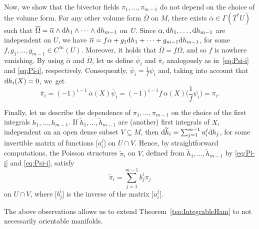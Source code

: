 \documentclass[pdftex]{sigma}%
\newcommand{\dd}{{\rm d}}
\numberwithin{equation}{section}
\begin{document}
Now, we show that the bivector fields $\pi_1,\dots,\pi_{m-1}$ do not depend on the choice of the volume form. For any other volume form $\overline{\Omega}$ on $M$, there exists $\overline{\alpha} \in \Gamma(T^{\ast}U)$ such that $\overline{\Omega} = \overline{\alpha}\wedge\dd h_1\wedge\cdots\wedge\dd h_{m-1}$ on~$U$. Since $\alpha,\dd h_1,\dots,\dd h_{m-1}$ are independent on $U$, we have $\overline{\alpha} = f\alpha + g_1\dd h_1 + \cdots + g_{m-1}\dd h_{m-1}$, for some $f,g_1,\dots,g_{m-1} \in C^{\infty}(U)$. Moreover, it holds that $\overline{\Omega}=f\Omega$, and so $f$ is nowhere vanishing. By using $\overline{\alpha}$ and $\overline{\Omega}$, let us define $\overline{\psi}_{i}$ and $\overline{\pi}_{i}$ analogously as in~\eqref{eq:Psi-i} and \eqref{eq:Pi-i}, respectively. Consequently, $\overline{\psi}_{i}=\tfrac{1}{f}\psi_{i}$ and, taking into account that $\dd h_{i}(X)=0$, we~get
 \begin{equation*}
 \overline{\pi}_{i} = (-1)^{i-1}\,\overline{\alpha}(X)\overline{\psi}_{i} = (-1)^{i-1}f\,\alpha(X)\bigg( \frac{1}{f} \psi_{i} \bigg) = \pi_{i}.
 \end{equation*}

Finally, let us describe the dependence of $\pi_1,\dots,\pi_{m-1}$ on the choice of the first integrals $h_1,\dots,h_{m-1}$. If $\widetilde{h}_1,\dots,\widetilde{h}_{m-1}$ are (another) first integrals of $X$, independent on an open dense subset $V\subseteq M$, then $\dd \widetilde{h}_{i} = \sum_{j=1}^{m-1}a^{j}_{i}\dd h_{j}$, for some invertible matrix of functions $\big[a^{j}_{i}\big]$ on $U\cap V$. Hence, by straightforward computations, the Poisson structures $\widetilde{\pi}_i$ on $V$, defined from $\widetilde{h}_1, \dots, \allowbreak \widetilde{h}_{m-1}$ by \eqref{eq:Pi-i} and \eqref{eq:Psi-i}, satisfy
 \begin{equation}\label{eq:PiTilde}
 \widetilde{\pi}_i = \sum_{j=1}^{m-1}b^{i}_{j}\pi_j
 \end{equation}
on $U\cap V$, where $\big[b^{i}_{j}\big]$ is the inverse of the matrix $\big[a^{j}_{i}\big]$.

The above observations allows us to extend Theorem~\ref{teo:IntegrableHam} to not necessarily orientable manifolds.
\end{document}
